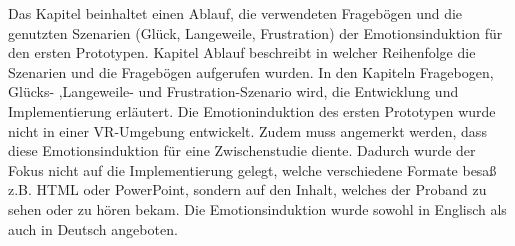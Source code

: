 

Das Kapitel beinhaltet einen Ablauf, die verwendeten Fragebögen und die genutzten Szenarien (Glück, Langeweile, Frustration) der Emotionsinduktion für den ersten Prototypen. 
Kapitel Ablauf beschreibt in welcher Reihenfolge die Szenarien und die Fragebögen aufgerufen wurden. 
In den Kapiteln Fragebogen, Glücks- ,Langeweile- und Frustration-Szenario wird, die Entwicklung und Implementierung erläutert. 
Die Emotioninduktion des ersten Prototypen wurde nicht in einer VR-Umgebung entwickelt. 
Zudem muss angemerkt werden, dass diese Emotionsinduktion für eine Zwischenstudie diente. 
Dadurch wurde der Fokus nicht auf die Implementierung gelegt, welche verschiedene Formate besaß z.B. HTML oder PowerPoint, sondern auf den Inhalt, welches der Proband zu sehen oder zu hören bekam.
Die Emotionsinduktion wurde sowohl in Englisch als auch in Deutsch angeboten.







